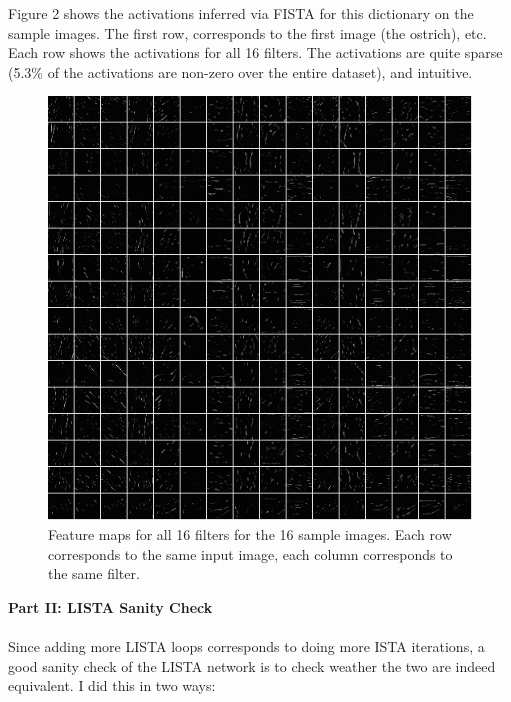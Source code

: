 \documentclass[12pt,a4paper]{report}
\begin{document}
Figure 2 shows the activations inferred via FISTA for this dictionary on the sample images. The first row, corresponds to the first image (the ostrich), etc. Each row shows the activations for all 16 filters. The activations are quite sparse (5.3\% of the activations are non-zero over the entire dataset), and intuitive. 
\begin{figure}[ht]
	\begin{center}
	\includegraphics[scale=0.75]{target.png}
	\end{center}
	\caption{Feature maps for all 16 filters for the 16 sample images. Each row corresponds to the same input image, each column corresponds to the same filter.}
\end{figure} 
\newpage
{\bf Part II: LISTA Sanity Check} \\ \\
Since adding more LISTA loops corresponds to doing more ISTA iterations, a good sanity check of the LISTA network is to check weather the two are indeed equivalent. 
I did this in two ways: 
\end{document}
